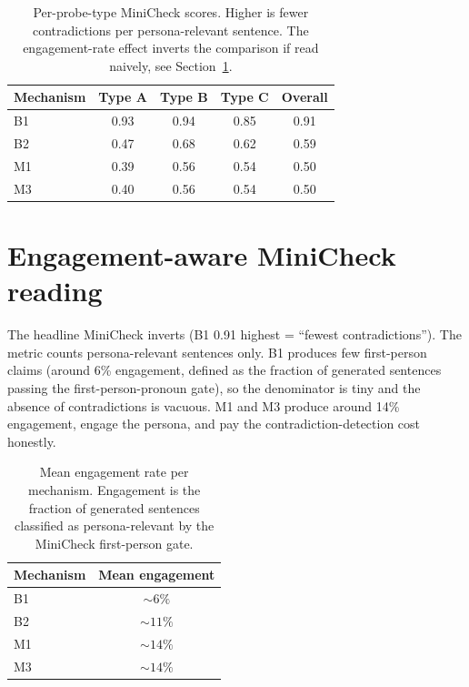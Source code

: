 \begin{table}[H]
  \centering
  \small
  \caption{Per-probe-type MiniCheck scores. Higher is fewer contradictions per persona-relevant sentence. The engagement-rate effect inverts the comparison if read naively, see Section~\ref{sec:engagement-aware-minicheck}.}
  \label{tab:per-probe-type-minicheck}
  \begin{tabular}{lcccc}
    \toprule
    \textbf{Mechanism} & \textbf{Type A} & \textbf{Type B} & \textbf{Type C} & \textbf{Overall} \\
    \midrule
    B1 & 0.93 & 0.94 & 0.85 & 0.91 \\
    B2 & 0.47 & 0.68 & 0.62 & 0.59 \\
    M1 & 0.39 & 0.56 & 0.54 & 0.50 \\
    M3 & 0.40 & 0.56 & 0.54 & 0.50 \\
    \bottomrule
  \end{tabular}
\end{table}

\section{Engagement-aware MiniCheck reading}
\label{sec:engagement-aware-minicheck}

The headline MiniCheck inverts (B1 0.91 highest = ``fewest contradictions''). The metric counts persona-relevant sentences only. B1 produces few first-person claims (around 6\% engagement, defined as the fraction of generated sentences passing the first-person-pronoun gate), so the denominator is tiny and the absence of contradictions is vacuous. M1 and M3 produce around 14\% engagement, engage the persona, and pay the contradiction-detection cost honestly.

\begin{table}[H]
  \centering
  \small
  \caption{Mean engagement rate per mechanism. Engagement is the fraction of generated sentences classified as persona-relevant by the MiniCheck first-person gate.}
  \label{tab:engagement-rate}
  \begin{tabular}{lc}
    \toprule
    \textbf{Mechanism} & \textbf{Mean engagement} \\
    \midrule
    B1 & $\sim 6\%$ \\
    B2 & $\sim 11\%$ \\
    M1 & $\sim 14\%$ \\
    M3 & $\sim 14\%$ \\
    \bottomrule
  \end{tabular}
\end{table}

